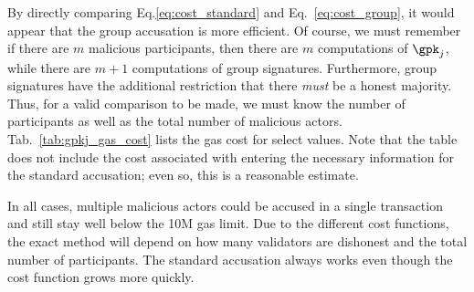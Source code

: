 By directly comparing Eq.\eqref{eq:cost_standard} and
Eq.~\eqref{eq:cost_group}, it would appear that the group accusation
is more efficient.
Of course, we must remember if there are $m$ malicious participants,
then there are $m$ computations of $\gpk_{j}$,
while there are $m+1$ computations of group signatures.
Furthermore, group signatures have the additional restriction that
there \emph{must} be a honest majority.
Thus, for a valid comparison to be made, we must know the
number of participants as well as the total number of malicious actors.
Tab.~\ref{tab:gpkj_gas_cost} lists the gas cost for select values.
Note that the table does not include the cost associated
with entering the necessary information for the standard accusation;
even so, this is a reasonable estimate.



In all cases, multiple malicious actors could be accused
in a single transaction and still stay well below the 10M gas limit.
Due to the different cost functions, the exact method will depend
on how many validators are dishonest and the total number of participants.
The standard accusation always works even though the cost function
grows more quickly.



